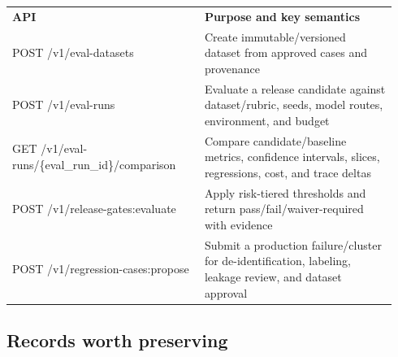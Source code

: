 \BookTableStart
\small
\begin{tabular}{@{}Y{0.4700\linewidth}Y{0.4700\linewidth}@{}}
\color{white}\bfseries \textbf{API} & \color{white}\bfseries \textbf{Purpose and key semantics} \\
POST /v1/eval-datasets & Create immutable/versioned dataset from approved cases and provenance \\
POST /v1/eval-runs & Evaluate a release candidate against dataset/rubric, seeds, model routes, environment, and budget \\
GET /v1/eval-runs/\{eval\_run\_id\}/comparison & Compare candidate/baseline metrics, confidence intervals, slices, regressions, cost, and trace deltas \\
POST /v1/release-gates:evaluate & Apply risk-tiered thresholds and return pass/fail/waiver-required with evidence \\
POST /v1/regression-cases:propose & Submit a production failure/cluster for de-identification, labeling, leakage review, and dataset approval \\
\end{tabular}
\BookTableEnd

\subsection{Records worth preserving}

